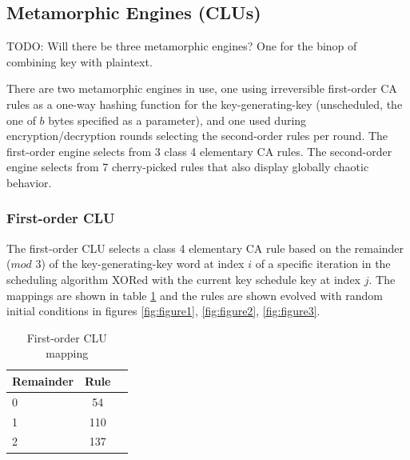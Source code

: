 \documentclass{article}
\begin{document}
\subsection{Metamorphic Engines (CLUs)}

TODO: Will there be three metamorphic engines? One for the binop of combining key with plaintext.

There are two metamorphic engines in use, one using irreversible first-order CA rules as a one-way hashing function for the key-generating-key (unscheduled, the one of $b$ bytes specified as a parameter), and one used during encryption/decryption rounds selecting the second-order rules per round. The first-order engine selects from 3 class 4 elementary CA rules. The second-order engine selects from 7 cherry-picked rules that also display globally chaotic behavior\cite{MECA-Properties}.

\subsubsection{First-order CLU}

The first-order CLU selects a class 4 elementary CA rule based on the remainder ($mod$ 3) of the key-generating-key word at index $i$ of a specific iteration in the scheduling algorithm XORed with the current key schedule key at index $j$. The mappings are shown in table \ref{tab:table1} and the rules are shown evolved with random initial conditions in figures \ref{fig:figure1}, \ref{fig:figure2}, \ref{fig:figure3}.

\begin{table}[h!]
  \begin{center}
    \caption{First-order CLU mapping}
    \label{tab:table1}
    \begin{tabular}{l|c|r} %
      \textbf{Remainder} & \textbf{Rule}\\
      \hline
      0 & 54\\
      1 & 110\\
      2 & 137\\
    \end{tabular}
  \end{center}
\end{table}
\end{document}
